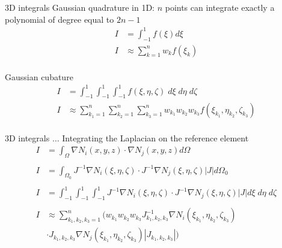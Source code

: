 \documentclass[handout]{beamer}
{
\usepackage{fullpage}
\usepackage{hyperref}
\usepackage{amssymb} 
}
\begin{document}
\begin{frame}{3D integrals}
Gaussian quadrature in 1D: $n$ points can integrate exactly a polynomial
of degree equal to $2 n - 1$
\begin{align*}
I &= \int_{-1}^1 f(\xi) d \xi  \\
I &\approx \sum_{k=1}^n w_k f(\xi_k) \\
\end{align*}


Gaussian cubature
\begin{align*}
I &= \int_{-1}^1 \int_{-1}^1 \int_{-1}^1 f(\xi, \eta, \zeta) \; d \xi \; d \eta \; d  \zeta \\
I &\approx \sum_{k_1=1}^n \sum_{k_2=1}^n \sum_{k_3=1}^n w_{k_1} w_{k_2} w_{k_3} f(\xi_{k_1}, \eta_{k_2}, \zeta_{k_3}) \\
\end{align*}

\end{frame}

\begin{frame}{3D integrals $\ldots$}
Integrating the Laplacian on the reference element
\begin{align*}
I &= \int_{\Omega} \nabla N_i(x,y,z) \cdot \nabla N_j(x,y,z) d \Omega \\ \\
I &= \int_{\Omega_0} J^{-1} \nabla N_i (\xi, \eta, \zeta) \cdot J^{-1}\nabla N_j (\xi, \eta, \zeta) |J| d \Omega_0 \\ \\
I &= \int_{-1}^1 \int_{-1}^1 \int_{-1}^1 J^{-1} \nabla N_i(\xi, \eta, \zeta) \cdot J^{-1}\nabla N_j(\xi, \eta, \zeta) |J| d \xi \; d \eta \; d \zeta\\ \\
I &\approx  \sum_{k_1,k_2,k_3=1}^n  ( w_{k_1} w_{k_2} w_{k_3} J^{-1}_{k_1,k_2,k_3} \nabla N_i(\xi_{k_1}, \eta_{k_2}, \zeta_{k_3}) 
\\ & \cdot J_{k_1,k_2,k_3} \nabla N_j(\xi_{k_1}, \eta_{k_2}, \zeta_{k_3}) |J_{k_1,k_2,k_3}| ) \\
\end{align*}

\end{frame}
\end{document}
